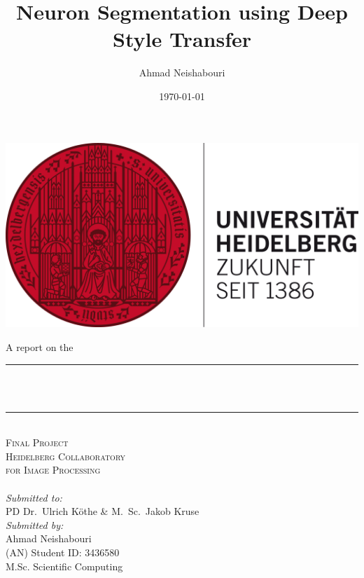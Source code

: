 \documentclass[12pt, a4paper]{scrartcl}
\title{Neuron Segmentation using Deep Style Transfer} %
\author{Ahmad Neishabouri}                               %
\date{\today}                                         %
\makeatletter
\let\thetitle\@title
\let\thedate\@date
\makeatother
\begin{document}

\begin{titlepage}
    \centering
    \includegraphics[scale = 0.6]{hdlogo}\\[2.0 cm]  %
     \begin{flushleft}
     \large  \hspace{1cm} A report on the 
	\end{flushleft}      
     \centering
    \rule{\linewidth}{0.2 mm} \\[0.4 cm]
    { \huge \bfseries \thetitle}\\
    \rule{\linewidth}{0.2 mm} \\[1.5 cm]
    
    \textsc{\LARGE Final Project}\\[0.5 cm]               %
    \textsc{\Large Heidelberg Collaboratory \\[0.5em] for Image Processing}\\[2.0 cm]  %
    \thedate
   	\\[3em]
    \large
            \emph{Submitted to:}\\[1em]
            PD Dr.\ Ulrich Köthe \& M.\ Sc.\ Jakob Kruse\\[1cm]
            \emph{Submitted by:} \\[1.5em]
    	    	    \large Ahmad Neishabouri \\(AN) Student ID: 3436580 \\ 
         	   		\small M.Sc. Scientific Computing



        
 
\end{titlepage}
\end{document}
